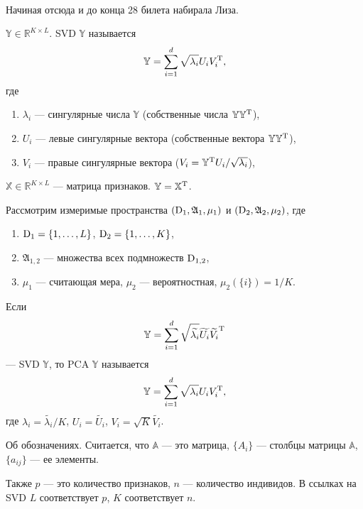 \\
{\color{blue} Начиная отсюда и до конца 28 билета набирала Лиза.}
\begin{notation}
$\mathbb{Y} \in \mathbb{R}^{K\times L}$. 
SVD $\mathbb{Y}$ называется
\begin{gather*}
\mathbb{Y} = \sum_{i = 1}^{d} \sqrt{\lambda_i}U_iV_i^{\rm T},
\end{gather*}
где 
\begin{enumerate}
\item
$\lambda_i$ --- сингулярные числа $\mathbb{Y}$ (собственные числа $\mathbb{Y}\mathbb{Y}^{\rm T}$),
\item
$U_i$ --- левые сингулярные вектора (собственные вектора $\mathbb{Y}\mathbb{Y}^{\rm T}$),
\item
$V_i$ --- правые сингулярные вектора ($V_i = \mathbb{Y}^{\rm T}U_i/\sqrt{\lambda_i}$),
\end{enumerate}
\end{notation}

\begin{notation}
$\mathbb{X} \in \mathbb{R}^{K\times L}$ --- матрица признаков.
$\mathbb{Y} = \mathbb{X}^{\rm T}$.

Рассмотрим измеримые пространства $({\rm D}_1, \mathfrak{A}_1, \mu_1)$ и $({\rm D}_2, \mathfrak{A}_2, \mu_2)$, где
\begin{enumerate}
\item
${\rm D}_1 = \{1,\ldots, L\}$, ${\rm D}_2 = \{1,\ldots, K\}$, 
\item
$\mathfrak{A}_{1, 2}$ --- множества всех подмножеств ${\rm D}_{1,2}$, 
\item
$\mu_1$ --- считающая мера, $\mu_2$ --- вероятностная, $\mu_2(\{i\}) = 1/K$.
\end{enumerate}
Если 
\begin{gather*}
\mathbb{Y} = \sum_{i = 1}^{d} \sqrt{\tilde{\lambda_i}}\tilde{U_i}\tilde{V_i}^{\rm T}
\end{gather*}
--- SVD $\mathbb{Y}$, то 
PCA $\mathbb{Y}$ называется
\begin{gather*}
\mathbb{Y} = \sum_{i = 1}^{d} \sqrt{\lambda_i}U_iV_i^{\rm T},
\end{gather*}
где
$\lambda_i = \tilde{\lambda_i}/K$,
$U_i = \tilde{U_i}$,
$V_i = \sqrt{K}\tilde{V_i}$.
\end{notation}

\begin{note}
Об обозначениях. Считается, что
$\mathbb{A}$ --- это матрица, $\{A_i\}$ --- столбцы матрицы $\mathbb{A}$, $\{a_{ij}\}$ --- ее элементы.

Также $p$ --- это количество признаков, $n$ --- количество индивидов.
В ссылках на SVD $L$ соответствует $p$, $K$ соответствует $n$.  
\end{note}

